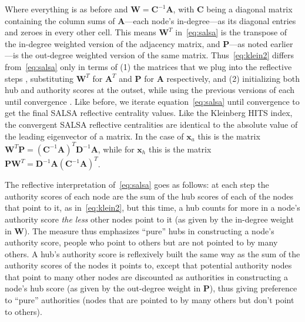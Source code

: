 \documentclass[a4paper,fleqn]{cas-sc}
\begin{document}
Where everything is as before and $\mathbf{W}=\mathbf{C}^{-1} \mathbf{A}$, with $\mathbf{C}$ being a diagonal matrix containing the column sums of $\mathbf{A}$---each node's in-degree---as its diagonal entries and zeroes in every other cell. This means $\mathbf{W}^T$ in~\ref{eq:salsa} is the transpose of the in-degree weighted version of the adjacency matrix, and $\mathbf{P}$---as noted earlier---is the out-degree weighted version of the same matrix. Thus~\ref{eq:klein2} differs from~\ref{eq:salsa} only in terms of (1) the matrices that we plug into the reflective steps \citep{lempel_moran01}, substituting  $\mathbf{W}^T$ for $\mathbf{A}^T$ and $\mathbf{P}$ for $\mathbf{A}$ respectively, and (2) initializing both hub and authority scores at the outset, while using the previous versions of each until convergence \citep[1186]{farahat_etal06}. Like before, we iterate equation~\ref{eq:salsa} until convergence to get the final SALSA reflective centrality values. Like the Kleinberg HITS index, the convergent SALSA reflective centralities are identical to the absolute value of the leading eigenvector of a matrix. In the case of $\mathbf{x}_a$ this is the matrix $\mathbf{W}^T\mathbf{P} = \left(\mathbf{C}^{-1}\mathbf{A}\right)^T\mathbf{D}^{-1}\mathbf{A}$, while for $\mathbf{x}_h$ this is the matrix $\mathbf{P}\mathbf{W}^T = \mathbf{D}^{-1}\mathbf{A}\left(\mathbf{C}^{-1}\mathbf{A}\right)^T$.

The reflective interpretation of~\ref{eq:salsa} goes as follows: at each step the authority scores of each node are the sum of the hub scores of each of the nodes that point to it, as in~\ref{eq:klein2}, but this time, a hub counts for more in a node's authority score \textit{the less} other nodes point to it (as given by the in-degree weight in $\mathbf{W}$). The measure thus emphasizes ``pure'' hubs in constructing a node's authority score, people who point to others but are not pointed to by many others. A hub's authority score is reflexively built the same way as the sum of the authority scores of the nodes it points to, except that potential authority nodes that point to many other nodes are discounted as authorities in constructing a node's hub score (as given by the out-degree weight in $\mathbf{P}$), thus giving preference to ``pure'' authorities (nodes that are pointed to by many others but don't point to others). 
\end{document}
